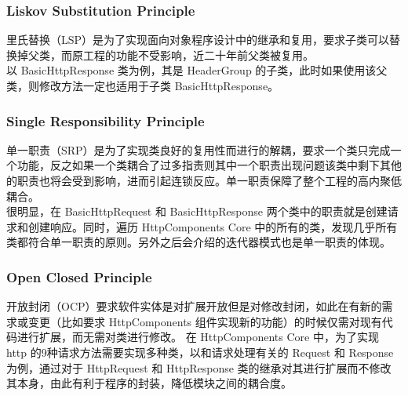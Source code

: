 \documentclass{article}
\begin{document}
	\subsubsection{Liskov Substitution Principle}
	\begin{CJK}{UTF8}{gbsn}
		\indent \indent 里氏替换（LSP）是为了实现面向对象程序设计中的继承和复用，要求子类可以替换掉父类，而原工程的功能不受影响，近二十年前父类被复用。\\
		\indent 以 BasicHttpResponse 类为例，其是 HeaderGroup 的子类，此时如果使用该父类，则修改方法一定也适用于子类 BasicHttpResponse。
	\end{CJK}{}

	\subsubsection{Single Responsibility Principle}
	\begin{CJK}{UTF8}{gbsn}
		\indent \indent 单一职责（SRP）是为了实现类良好的复用性而进行的解耦，要求一个类只完成一个功能，反之如果一个类耦合了过多指责则其中一个职责出现问题该类中剩下其他的职责也将会受到影响，进而引起连锁反应。单一职责保障了整个工程的高内聚低耦合。\\
		\indent 很明显，在 BasicHttpRequest 和 BasicHttpResponse 两个类中的职责就是创建请求和创建响应。同时，遍历 HttpComponents Core 中的所有的类，发现几乎所有类都符合单一职责的原则。另外之后会介绍的迭代器模式也是单一职责的体现。
	\end{CJK}{}

	\subsubsection{Open Closed Principle}
	\begin{CJK}{UTF8}{gbsn}
		\indent \indent 开放封闭（OCP）要求软件实体是对扩展开放但是对修改封闭，如此在有新的需求或变更（比如要求 HttpComponents 组件实现新的功能）的时候仅需对现有代码进行扩展，而无需对类进行修改。
		\indent 在 HttpComponents Core 中，为了实现 http 的9种请求方法需要实现多种类，以和请求处理有关的 Request 和 Response 为例，通过对于 HttpRequest 和 HttpResponse 类的继承对其进行扩展而不修改其本身，由此有利于程序的封装，降低模块之间的耦合度。
	\end{CJK}{}
\end{document}
